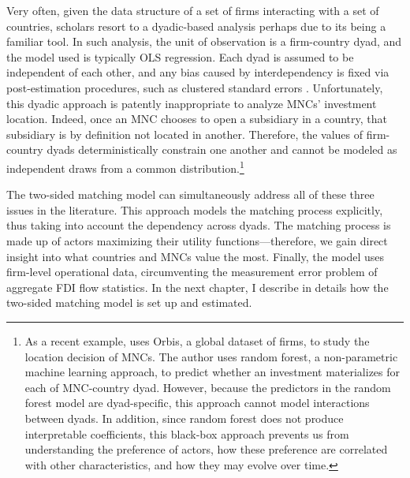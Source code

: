 Very often, given the data structure of a set of firms interacting with a set of
countries, scholars resort to a dyadic-based analysis perhaps due to its being a
familiar tool. In such analysis, the unit of observation is a firm-country dyad,
and the model used is typically OLS regression. Each dyad is assumed to be
independent of each other, and any bias caused by interdependency is fixed via
post-estimation procedures, such as clustered standard errors \citep{Dorff2013}.
Unfortunately, this dyadic approach is patently inappropriate to analyze MNCs'
investment location. Indeed, once an MNC chooses to open a subsidiary in a
country, that subsidiary is by definition not located in another. Therefore, the
values of firm-country dyads deterministically constrain one another and cannot
be modeled as independent draws from a common distribution.\footnote{As a recent
  example, \citet{Arel-Bundock2017} uses Orbis, a global dataset of firms, to
  study the location decision of MNCs. The author uses random forest, a
  non-parametric machine learning approach, to predict whether an investment
  materializes for each of MNC-country dyad. However, because the predictors in
  the random forest model are dyad-specific, this approach cannot model
  interactions between dyads. In addition, since random forest does not produce
  interpretable coefficients, this black-box approach prevents us from
  understanding the preference of actors, how these preference are correlated
  with other characteristics, and how they may evolve over time.}

The two-sided matching model can simultaneously address all of these three
issues in the literature. This approach models the matching process explicitly,
thus taking into account the dependency across dyads. The matching process is
made up of actors maximizing their utility functions---therefore, we gain direct
insight into what countries and MNCs value the most. Finally, the model uses
firm-level operational data, circumventing the measurement error problem of
aggregate FDI flow statistics. In the next chapter, I describe in details how
the two-sided matching model is set up and estimated.

